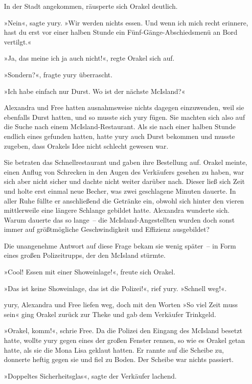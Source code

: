 In der Stadt angekommen, räusperte sich Orakel deutlich.

»Nein«, sagte yury. »Wir werden nichts essen. Und wenn ich mich recht erinnere, hast du erst vor einer halben Stunde ein Fünf-Gänge-Abschiedsmenü an Bord vertilgt.«

»Ja, das meine ich ja auch nicht!«, regte Orakel sich auf.

»Sondern?«, fragte yury überrascht.

»Ich habe einfach nur Durst. Wo ist der nächste McIsland?«

Alexandra und Free hatten ausnahmsweise nichts dagegen einzuwenden, weil sie ebenfalls Durst hatten, und so musste sich yury fügen. Sie machten sich also auf die Suche nach einem McIsland-Restaurant. Als sie nach einer halben Stunde endlich eines gefunden hatten, hatte yury auch Durst bekommen und musste zugeben, dass Orakels Idee nicht schlecht gewesen war.

Sie betraten das Schnellrestaurant und gaben ihre Bestellung auf. Orakel meinte, einen Anflug von Schrecken in den Augen des Verkäufers gesehen zu haben, war sich aber nicht sicher und dachte nicht weiter darüber nach. Dieser ließ sich Zeit und holte erst einmal neue Becher, was zwei geschlagene Minuten dauerte. In aller Ruhe füllte er anschließend die Getränke ein, obwohl sich hinter den vieren mittlerweile eine längere Schlange gebildet hatte. Alexandra wunderte sich. Warum dauerte das so lange~– die McIsland-Angestellten wurden doch sonst immer auf größtmögliche Geschwindigkeit und Effizienz ausgebildet?

Die unangenehme Antwort auf diese Frage bekam sie wenig später~– in Form eines großen Polizeitrupps, der den McIsland stürmte.

»Cool! Essen mit einer Showeinlage!«, freute sich Orakel.

»Das ist keine Showeinlage, das ist die Polizei!«, rief yury. »Schnell weg!«.

yury, Alexandra und Free liefen weg, doch mit den Worten »So viel Zeit muss sein« ging Orakel zurück zur Theke und gab dem Verkäufer Trinkgeld.

»Orakel, komm!«, schrie Free. Da die Polizei den Eingang des McIsland besetzt hatte, wollte yury gegen eines der großen Fenster rennen, so wie es Orakel getan hatte, als sie die Mona Lisa geklaut hatten. Er rannte auf die Scheibe zu, donnerte heftig gegen sie und fiel zu Boden. Der Scheibe war nichts passiert.

»Doppeltes Sicherheitsglas«, sagte der Verkäufer lachend.


